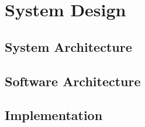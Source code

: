 \chapter{System Design}
\blindtext%

\section{System Architecture}
\blindtext%

\section{Software Architecture}
\blindtext%

\section{Implementation}
\blindtext%
